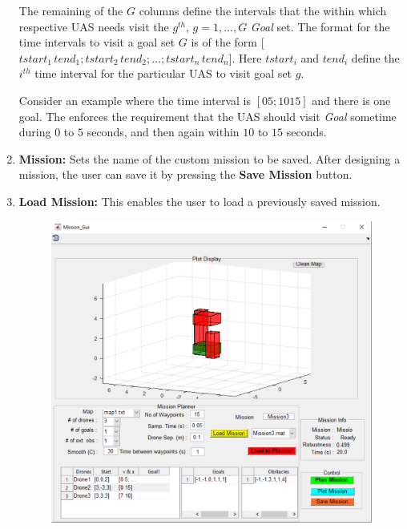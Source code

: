 \documentclass[english]{article}
\begin{document}
\begin{enumerate}
The remaining of the $G$ columns define the intervals that the within which respective UAS needs visit the $g^{th},\, g=1,\dotsc,G$ \textit{Goal} set. The format for the time intervals to visit a goal set $G$ is of the form [$tstart_1\, tend_1; tstart_2\, tend_2;\dotsc;tstart_n\, tend_n$]. Here $tstart_i$ and $tend_i$ define the $i^{th}$ time interval for the particular UAS to visit goal set $g$.

Consider an example where the time interval is $[0 5; 10 15]$ and there is one goal. The enforces the requirement that the UAS should visit \textit{Goal} sometime during $0$ to $5$ seconds, and then again within $10$ to $15$ seconds. 

    \item \textbf{Mission:} Sets the name of the custom mission to be saved. After designing a mission, the user can save it by pressing the \textbf{Save Mission} button.
    \item \textbf{Load Mission:} This enables the user to load a previously saved mission.
    \begin{figure}[H]
        \centering
        \includegraphics[scale=0.5]{load.pdf}
    \end{figure}
    

\end{enumerate}
\end{document}
